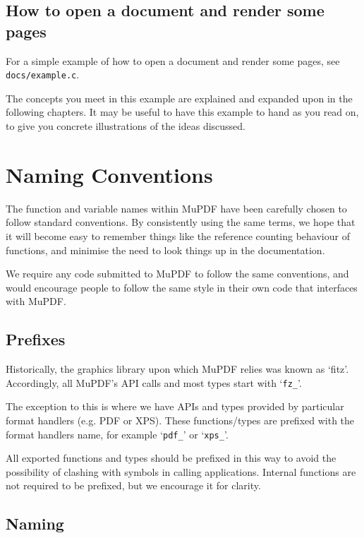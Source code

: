 \documentclass[oneside]{book}
\begin{document}
\section{How to open a document and render some pages}

For a simple example of how to open a document and render some pages, see \texttt{docs/example.c}.

The concepts you meet in this example are explained and expanded upon in the following chapters. It may be useful to have this example to hand as you read on, to give you concrete illustrations of the ideas discussed.


\chapter{Naming Conventions}

The function and variable names within MuPDF have been carefully chosen to follow standard conventions. By consistently using the same terms, we hope that it will become easy to remember things like the reference counting behaviour of functions, and minimise the need to look things up in the documentation.

We require any code submitted to MuPDF to follow the same conventions, and would encourage people to follow the same style in their own code that interfaces with MuPDF.

\section{Prefixes}

Historically, the graphics library upon which MuPDF relies was known as `fitz'. Accordingly, all MuPDF's API calls and most types start with `\texttt{fz\_}'.

The exception to this is where we have APIs and types provided by particular format handlers (e.g. PDF or XPS). These functions/types are prefixed with the format handlers name, for example `\texttt{pdf\_}' or `\texttt{xps\_}'.

All exported functions and types should be prefixed in this way to avoid the possibility of clashing with symbols in calling applications. Internal functions are not required to be prefixed, but we encourage it for clarity.

\section{Naming}
\end{document}
